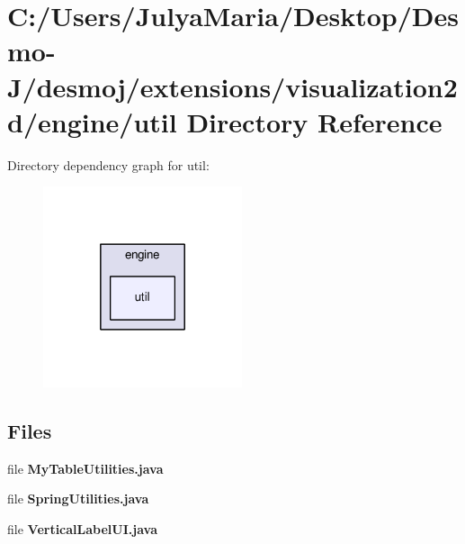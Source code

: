 \section{C\-:/\-Users/\-Julya\-Maria/\-Desktop/\-Desmo-\/\-J/desmoj/extensions/visualization2d/engine/util Directory Reference}
\label{dir_7c9011b992a34aa5b16539aff0a8d583}
Directory dependency graph for util\-:
\nopagebreak
\begin{figure}[H]
\begin{center}
\leavevmode
\includegraphics[width=166pt]{dir_7c9011b992a34aa5b16539aff0a8d583_dep}
\end{center}
\end{figure}
\subsection*{Files}
\begin{DoxyCompactItemize}
\item 
file {\bfseries My\-Table\-Utilities.\-java}
\item 
file {\bfseries Spring\-Utilities.\-java}
\item 
file {\bfseries Vertical\-Label\-U\-I.\-java}
\end{DoxyCompactItemize}
